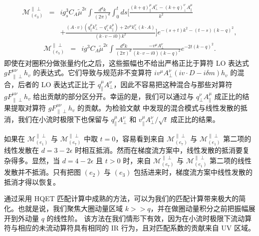 \begin{eqnarray}
\label{eq:e3pperp}
\mathcal{M}_{(e_3)}^{\|\perp}
&=&ig_s^3C_A\tilde{\mu}^{2\epsilon}\int\frac{d^dk}{(2\pi)^d}\int_0^t ds \Bigg[\frac{(k+q)^{\mu}_{\|}A^{\nu}_{\perp}-(k+q)^{\nu}_{\perp}A^{\mu}_{\|}}{k^2}\nonumber\\
&&+\frac{(A\cdot v)\left(q^{\mu}_{\|}k^{\nu}_{\perp}-q^{\nu}_{\perp}k^{\mu}_{\|}\right)+2v^{\mu}k_{\perp}^{\nu}(k\cdot A)}{(k\cdot v-i0)k^2}\Bigg]e^{-(s+t)k^2-(t-s)(k-q)^2},
\end{eqnarray}
\begin{eqnarray}
\label{eq:e7pperp}
\mathcal{M}_{(e_7)}^{\|\perp}
&=&ig^3C_A\tilde{\mu}^{2\epsilon}\int\frac{d^dk}{(2\pi)^d}\frac{-v^{\mu}A_{\perp}^{\nu} }{(k\cdot v-i0)(k-q)^2}e^{-2t(k-q)^2}.
\end{eqnarray}
即使在对圈积分做张量约化之后，这些振幅也不给出严格正比于算符 LO 表达式 $gF^{\mu\nu}_{\|\perp}h_v$ 的表达式。它们导致与规范非不变算符 $iv^{\mu}A_{\perp}^{\nu}(iv\cdot D - i\delta m) h_v$ 的混合，后者的 LO 表达式正比于 $q_{\|}^{\mu}A_{\perp}^{\nu}$，因此不容易把这种混合与那些对算符 $gF^{\mu\nu}_{\|\perp}h_v$ 给出贡献的部分区分开。幸运的是，我们可以通过与 $q_{\perp}^{\nu}A_{\|}^{\mu}$ 成正比的结果提取对算符 $gF^{\mu\nu}_{\|\perp}h_v$ 的贡献。为检验文献 \cite{Dorn:1981wa,Zhang:2018diq,Wang:2019tgg} 中发现的混合模式与线性发散的抵消，我们在小流时极限下也保留与 $q_{\|}^{\mu}A_{\perp}^{\nu}$ 和 $v_{\|}^{\mu}A_{\perp}^{\nu}/\sqrt{t}$ 成正比的结果。

如果在 $\mathcal{M}_{(e_1)}^{\|\perp}$ 与 $\mathcal{M}_{(e_7)}^{\|\perp}$ 中取 $t=0$，容易看到来自 $\mathcal{M}_{(e_7)}^{\|\perp}$ 与 $\mathcal{M}_{(e_1)}^{\|\perp}$ 第二项的线性发散在 $d=3-2\epsilon$ 时相互抵消。然而在梯度流方案中，线性发散的抵消要复杂得多。显然，当 $d=4-2\epsilon$ 且 $t>0$ 时，来自 $\mathcal{M}_{(e_7)}^{\|\perp}$ 与 $\mathcal{M}_{(e_1)}^{\|\perp}$ 第二项的线性发散并不抵消。只有把图 $(e_2)$ 与 $(e_3)$ 包括进来时，梯度流方案中线性发散的抵消才得以恢复。

通过采用 HQET 匹配计算中成熟的方法，可以为我们的匹配计算带来极大的简化。也就是说，我们聚焦大圈动量区域 $k >> q$，并在做圈动量积分之前把振幅展开到外动量 $q$ 的线性阶。
该方法在我们情形下有效，因为在小流时极限下流动算符与相应的未流动算符具有相同的 IR 行为，且对匹配系数的贡献来自 UV 区域。

